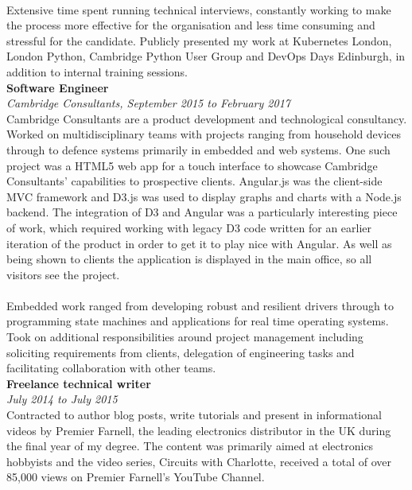 \documentclass{article}
\begin{document}
\begin{flushleft}
\paragraph{}Extensive time spent running technical interviews, constantly working to make the process more effective for the organisation and less time consuming and stressful for the candidate. Publicly presented my work at Kubernetes London, London Python, Cambridge Python User Group and DevOps Days Edinburgh, in addition to internal training sessions.\\[10pt]

\textbf{Software Engineer}\\
\textit{Cambridge Consultants, September 2015 to February 2017}\\[5pt]
Cambridge Consultants are a product development and technological consultancy. Worked on multidisciplinary teams with projects ranging from household devices through to defence systems primarily in embedded and web systems. One such project was a HTML5 web app for a touch interface to showcase Cambridge Consultants' capabilities to prospective clients. Angular.js was the client-side MVC framework and D3.js was used to display graphs and charts with a Node.js backend. The integration of D3 and Angular was a particularly interesting piece of work, which required working with legacy D3 code written for an earlier iteration of the product in order to get it to play nice with Angular. As well as being shown to clients the application is displayed in the main office, so all visitors see the project.

\paragraph{}Embedded work ranged from developing robust and resilient drivers through to programming state machines and applications for real time operating systems. Took on additional responsibilities around project management including soliciting requirements from clients, delegation of engineering tasks and facilitating collaboration with other teams.\\[10pt]

\textbf{Freelance technical writer}\\
\textit{July 2014 to July 2015}\\[5pt]
Contracted to author blog posts, write tutorials and present in informational videos by Premier Farnell, the leading electronics distributor in the UK during the final year of my degree. The content was primarily aimed at electronics hobbyists and the video series, Circuits with Charlotte, received a total of over 85,000 views on Premier Farnell's YouTube Channel.


\end{flushleft}
\end{document}
